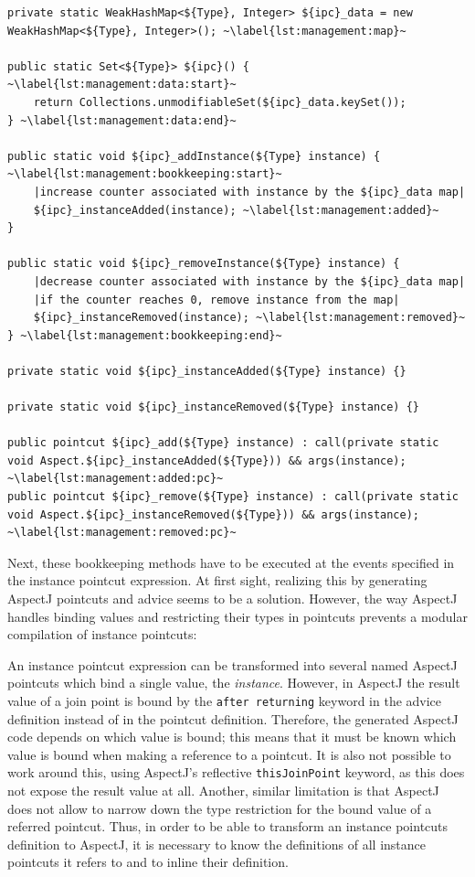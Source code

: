 \documentclass{acm_proc_article-sp}
\begin{document}
\begin{lstlisting}[caption={Template of generated code for instance set management.},label=lst:management]
private static WeakHashMap<${Type}, Integer> ${ipc}_data = new WeakHashMap<${Type}, Integer>(); ~\label{lst:management:map}~

public static Set<${Type}> ${ipc}() { ~\label{lst:management:data:start}~
	return Collections.unmodifiableSet(${ipc}_data.keySet());
} ~\label{lst:management:data:end}~

public static void ${ipc}_addInstance(${Type} instance) { ~\label{lst:management:bookkeeping:start}~
	|increase counter associated with instance by the ${ipc}_data map|
	${ipc}_instanceAdded(instance); ~\label{lst:management:added}~
}

public static void ${ipc}_removeInstance(${Type} instance) {
	|decrease counter associated with instance by the ${ipc}_data map|
	|if the counter reaches 0, remove instance from the map|
	${ipc}_instanceRemoved(instance); ~\label{lst:management:removed}~
} ~\label{lst:management:bookkeeping:end}~

private static void ${ipc}_instanceAdded(${Type} instance) {}

private static void ${ipc}_instanceRemoved(${Type} instance) {}

public pointcut ${ipc}_add(${Type} instance) : call(private static void Aspect.${ipc}_instanceAdded(${Type})) && args(instance); ~\label{lst:management:added:pc}~
public pointcut ${ipc}_remove(${Type} instance) : call(private static void Aspect.${ipc}_instanceRemoved(${Type})) && args(instance); ~\label{lst:management:removed:pc}~
\end{lstlisting}

Next, these bookkeeping methods have to be executed at the events specified in the instance pointcut expression.
At first sight, realizing this by generating AspectJ pointcuts and advice seems to be a solution.
However, the way AspectJ handles binding values and restricting their types in pointcuts prevents a modular compilation of instance pointcuts:

An instance pointcut expression can be transformed into several named AspectJ pointcuts which bind a single value, the \emph{instance}.
However, in AspectJ the result value of a join point is bound by the \lstinline{after returning} keyword in the advice definition instead of in the pointcut definition.
Therefore, the generated AspectJ code depends on which value is bound; this means that it must be known which value is bound when making a reference to a pointcut.
It is also not possible to work around this, using AspectJ's reflective \lstinline{thisJoinPoint} keyword, as this does not expose the result value at all.
Another, similar limitation is that AspectJ does not allow to narrow down the type restriction for the bound value of a referred pointcut.
Thus, in order to be able to transform an instance pointcuts definition to AspectJ, it is necessary to know the definitions of all instance pointcuts it refers to and to inline their definition.
\end{document}
